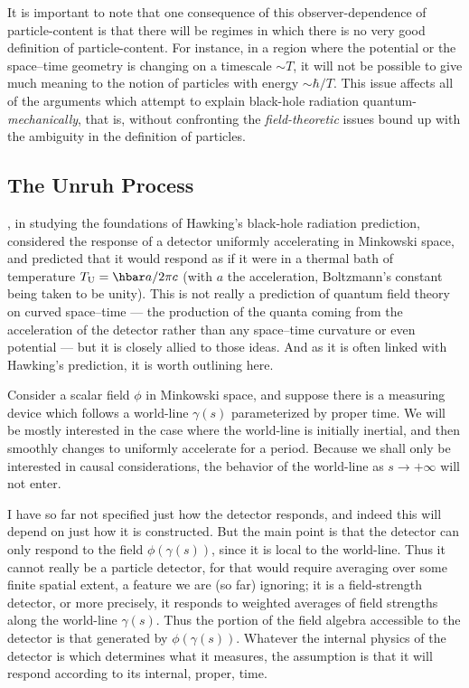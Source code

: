 \documentclass[12pt]{article}
\begin{document}
It is important to note that one consequence of this observer-dependence of particle-content is that there will be regimes in which there is no very good definition of particle-content.  For instance, in a region where the potential or the space--time geometry is changing on a timescale $\sim T$, it will not be possible to give much meaning to the notion of particles with energy $\sim\hbar /T$.  
This issue affects all of the arguments which attempt to explain black-hole radiation quantum-{\em mechanically}, that is, without confronting the {\em field-theoretic} issues bound up with the ambiguity in the definition of particles.


\subsection{The Unruh Process}

\citet{Unruh:1976db}, in studying the foundations of Hawking's black-hole radiation prediction, considered the response of a detector uniformly accelerating in Minkowski space, and predicted that it would respond as if it were in a thermal bath of temperature $T_{\rm U}=\hbar a/2\pi c$ (with $a$ the acceleration, Boltzmann's constant being taken to be unity).  This is not really a prediction of quantum field theory on curved space--time --- the production of the quanta coming from the acceleration of the detector rather than any space--time curvature or even potential --- but it is closely allied to those ideas.  And as it is often linked with Hawking's prediction, it is worth outlining here.



Consider a scalar field $\phi$ in Minkowski space, and suppose there is a measuring device which follows a world-line $\gamma (s)$ parameterized by proper time.  We will be mostly interested in the case where the world-line is initially inertial, and then smoothly changes to uniformly accelerate for a period.  Because we shall only be interested in causal considerations, the behavior of the world-line as $s\to +\infty$ will not enter.

I have so far not specified just how the detector responds, and indeed this will depend on just how it is constructed.  But the main point is that the detector can only respond to the field $\phi (\gamma (s))$, since it is local to the world-line.  Thus it cannot really be a particle detector, for that would require averaging over some finite spatial extent, a feature we are (so far) ignoring; it is a field-strength detector, or more precisely, it responds to weighted averages of field strengths along the world-line $\gamma (s)$.
Thus the portion of the field algebra accessible to the detector is that generated by $\phi (\gamma (s))$.  Whatever the internal physics of the detector is which determines what it measures, the assumption is that it will respond according to its internal, proper, time.
\end{document}
